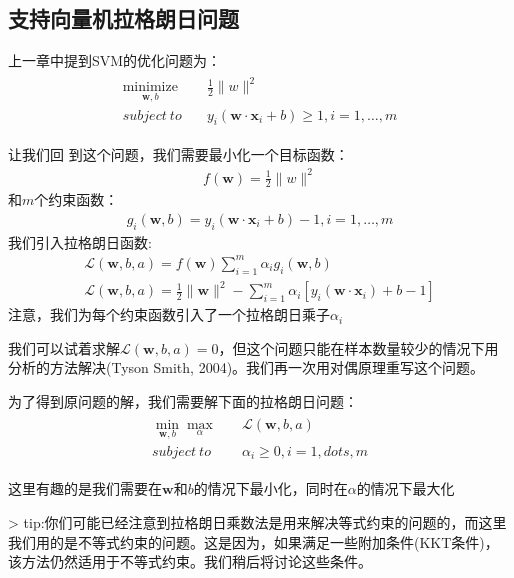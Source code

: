 \subsection{支持向量机拉格朗日问题}

上一章中提到SVM的优化问题为：
\begin{gather*}
\begin{align*}
\underset{\mathbf{w},b}{\text{minimize}} \quad &\frac{1}{2}\|w\|^2 \\
subject\ to\quad &y_i(\mathbf{w}\cdot\mathbf{x}_i+b) \geq 1,i=1,\dots,m
\end{align*}
\end{gather*}

让我们回 到这个问题，我们需要最小化一个目标函数：
\begin{gather*}
f(\mathbf{w}) = \frac{1}{2}\|w\|^2
\end{gather*}
和$m$个约束函数：
\begin{gather*}
g_i(\mathbf{w},b)=y_i(\mathbf{w}\cdot \mathbf{x}_i+b)-1,i=1,\dots,m
\end{gather*}
我们引入拉格朗日函数:
\begin{gather*}
\mathcal{L}(\mathbf{w},b,a)=f(\mathbf{w})\sum_{i=1}^m \alpha_i g_i(\mathbf{w},b) \\
\mathcal{L}(\mathbf{w},b,a)=\frac{1}{2}\|\mathbf{w}\|^2-\sum_{i=1}^m \alpha_i [y_i(\mathbf{w}\cdot \mathbf{x}_i)+b-1]
\end{gather*}
注意，我们为每个约束函数引入了一个拉格朗日乘子$\alpha_i$

我们可以试着求解$\mathcal{L}(\mathbf{w},b,a)=0$，但这个问题只能在样本数量较少的情况下用分析的方法解决(Tyson Smith, 2004)。我们再一次用对偶原理重写这个问题。

为了得到原问题的解，我们需要解下面的拉格朗日问题：
\begin{gather*}
\begin{align*}
\min_{\mathbf{w},b} \max_\alpha \quad &\mathcal{L}(\mathbf{w},b,a) \\
subject\ to\quad &\alpha_i \geq 0,i=1,dots,m
\end{align*}
\end{gather*}

这里有趣的是我们需要在$\mathbf{w}$和$b$的情况下最小化，同时在$\alpha$的情况下最大化

> tip:你们可能已经注意到拉格朗日乘数法是用来解决等式约束的问题的，而这里我们用的是不等式约束的问题。这是因为，如果满足一些附加条件(KKT条件)，该方法仍然适用于不等式约束。我们稍后将讨论这些条件。




